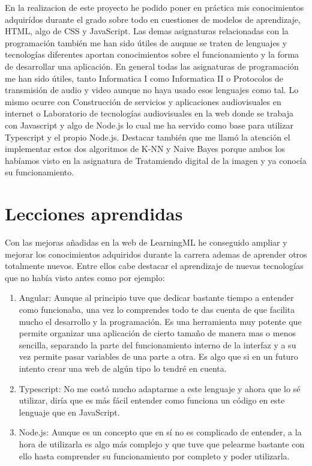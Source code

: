 \documentclass[a4paper, 12pt]{book}
\begin{document}
En la realizacion de este proyecto he podido poner en práctica mis conocimientos adquirídos durante el grado sobre todo en cuestiones de modelos de aprendizaje, HTML, algo de CSS y JavaScript. Las demas asignaturas relacionadas con la programación también me han sido útiles de auqnue se traten de lenguajes y tecnologías diferentes aportan conocimientos sobre el funcionamiento y la forma de desarrollar una aplicación. En general todas las asignaturas de programación me han sido útiles, tanto Informatica I como Informatica II o Protocolos de transmisión de audio y video aunque no haya usado esos lenguajes como tal. Lo mismo ocurre con Construcción de servicios y aplicaciones audiovisuales en internet o Laboratorio de tecnologías audiovisuales en la web donde se trabaja con Javascript y algo de Node.js lo cual me ha servido como base para utilizar Typescript y el propio Node.js.
Destacar también que me llamó la atención el implementar estos dos algoritmos de K-NN y Naive Bayes porque ambos los habíamos visto en la asignatura de Tratamiendo digital de la imagen y ya conocía su funcionamiento.

\section{Lecciones aprendidas}
\label{sec:lecciones_aprendidas}

Con las mejoras añadidas en la web de LearningML he conseguido ampliar y mejorar los conocimientos adquiridos durante la carrera ademas de aprender otros totalmente nuevos. Entre ellos cabe destacar el aprendizaje de nuevas tecnologías que no había visto antes como por ejemplo:

\begin{enumerate}
  \item Angular: Aunque al principio tuve que dedicar bastante tiempo a entender como funcionaba, una vez lo comprendes todo te das cuenta de que facilita mucho el desarrollo y la programación. Es una herramienta muy potente que permite organizar una aplicación de cierto tamaño de manera mas o menos sencilla, separando la parte del funcionamiento interno de la interfaz y a su vez permite pasar variables de una parte a otra. Es algo que si en un futuro intento crear una web de algún tipo lo tendré en cuenta.

  \item Typescript: No me costó mucho adaptarme a este lenguaje y ahora que lo sé utilizar, diría que es más fácil entender como funciona un código en este lenguaje que en JavaScript.

  \item Node.js: Aunque es un concepto que en sí no es complicado de entender, a la hora de utilizarla es algo más complejo y que tuve que pelearme bastante con ello hasta comprender su funcionamiento por completo y poder utilizarla.
\end{enumerate}
\end{document}
